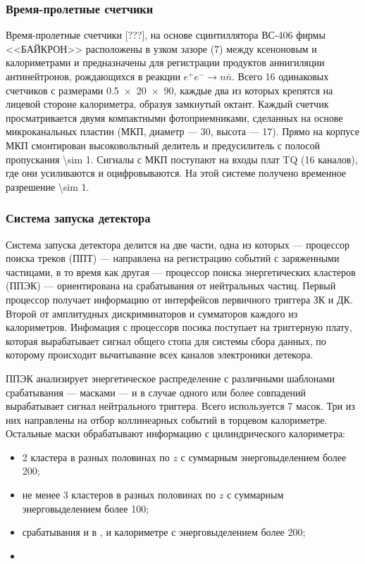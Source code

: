 \subsubsection{Время-пролетные счетчики}
\label{sec:tof}

Время-пролетные счетчики [???], на основе сцинтиллятора ВС-406 фирмы <<БАЙКРОН>> расположены в
узком зазоре (\SI{7}{\mmr}) между ксеноновым и  калориметрами и предназначены для регистрации продуктов
аннигиляции антинейтронов, рождающихся в реакции $e^+e^- \to n \bar{n}$. 
Всего \num{16} одинаковых счетчиков с размерами \SI[product-units = power]{0.5 x 20 x 90}{\cmr},
каждые два из которых крепятся на лицевой стороне  калориметра,
образуя замкнутый октант.
Каждый счетчик просматривается двумя компактными фотоприемниками,
сделанных на основе микроканальных пластин
(МКП, диаметр --- \SI{30}{\mmr}, высота --- \SI{17}{\mmr}). 
Прямо на корпусе МКП смонтирован высоковольтный делитель и предусилитель с полосой пропускания \SI{\sim 1}{\GHzr}. 
Сигналы с МКП поступают на входы плат TQ (\num{16} каналов),
где они усиливаются и оцифровываются. 
На этой системе получено временное разрешение \SI{\sim 1}{\nsr}.




\subsubsection{Система запуска детектора}
\label{sec:trigger}

Система запуска детектора делится на две части,
одна из которых --- процессор поиска треков (ППТ) --- направлена на регистрацию событий с заряженными частицами,
в то время как другая --- процессор поиска энергетических кластеров (ППЭК) --- ориентирована на срабатывания от нейтральных частиц.
Первый процессор получает информацию от интерфейсов первичного триггера ЗК и ДК.
Второй от амплитудных дискриминаторов и сумматоров каждого из калориметров.
Инфомация с процессорв посика поступает на триггерную плату,
которая вырабатывает сигнал общего стопа для системы сбора данных,
по которому происходит вычитывание всех каналов электроники детекора.

ППЭК анализирует энергетическое распределение с различными шаблонами срабатывания --- масками ---
и в случае одного или более совпадений вырабатывает сигнал нейтрального триггера.
Всего используется 7 масок.
Три из них направлены на отбор коллинеарных событий в торцевом калориметре.
Остальные маски обрабатывают информацию с цилиндрического калориметра:
\begin{itemize}
    \item 2 кластера в разных половинах по $z$ с суммарным энерговыделением более \SI{200}{\MeVr};
    \item не менее 3 кластеров в разных половинах по $z$ с суммарным энерговыделением более \SI{100}{\MeVr};
    \item срабатывания и в , и  калориметре с энерговыделением более \SI{200}{\MeVr};
    \item 
\end{itemize}







